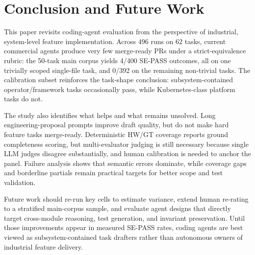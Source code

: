 \section{Conclusion and Future Work}
\label{sec:conclusion}

This paper revisits coding-agent evaluation from the perspective of industrial, system-level feature implementation. Across 496 runs on 62 tasks, current commercial agents produce very few merge-ready PRs under a strict-equivalence rubric: the 50-task main corpus yields 4/400 SE-PASS outcomes, all on one trivially scoped single-file task, and 0/392 on the remaining non-trivial tasks. The calibration subset reinforces the task-shape conclusion: subsystem-contained operator/framework tasks occasionally pass, while Kubernetes-class platform tasks do not.

The study also identifies what helps and what remains unsolved. Long engineering-proposal prompts improve draft quality, but do not make hard feature tasks merge-ready. Deterministic HW/GT coverage reports ground completeness scoring, but multi-evaluator judging is still necessary because single LLM judges disagree substantially, and human calibration is needed to anchor the panel. Failure analysis shows that semantic errors dominate, while coverage gaps and borderline partials remain practical targets for better scope and test validation.

Future work should re-run key cells to estimate variance, extend human re-rating to a stratified main-corpus sample, and evaluate agent designs that directly target cross-module reasoning, test generation, and invariant preservation. Until those improvements appear in measured SE-PASS rates, coding agents are best viewed as subsystem-contained task drafters rather than autonomous owners of industrial feature delivery.

